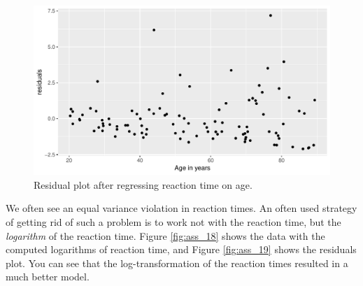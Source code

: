 \documentclass[]{report}\usepackage[]{graphicx}\usepackage[]{color}
\makeatletter
\def\maxwidth{ %
  \ifdim\Gin@nat@width>\linewidth
    \linewidth
  \else
    \Gin@nat@width
  \fi
}
\newenvironment{knitrout}{}{} %
\makeatother
\begin{document}
\begin{knitrout}
\color{fgcolor}\begin{figure}

{\centering \includegraphics[width=\maxwidth]{figure/ass_17-1} 

}

\caption[Residual plot after regressing reaction time on age]{Residual plot after regressing reaction time on age.}\label{fig:ass_17}
\end{figure}


\end{knitrout}



We often see an equal variance violation in reaction times. An often used strategy of getting rid of such a problem is to work not with the reaction time, but the \textit{logarithm} of the reaction time. Figure \ref{fig:ass_18} shows the data with the computed logarithms of reaction time, and Figure \ref{fig:ass_19} shows the residuals plot. You can see that the log-transformation of the reaction times resulted in a much better model. 
\end{document}
